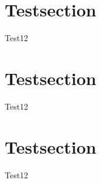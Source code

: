 \documentclass[12pt,a4paper,english]{article}
\begin{document}
\tableofcontents

\newpage
\section{Testsection} %
 Test12

 \newpage
\section{Testsection} %
 Test12

 \newpage
\section{Testsection} %
 Test12
\end{document}
